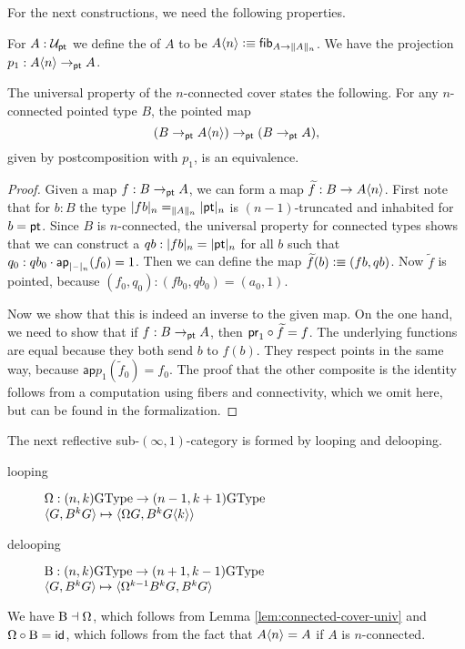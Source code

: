 For the next constructions, we need the following properties.
\begin{defn}
  For $A : \UU_\pt$ we define the  of $A$ to be 
  $A{\angled n} \defeq  \fibf{A \to \trunc{n}{A}}$. We have the projection $p_1: A{\angled n} \to_\pt A$.
\end{defn}

\begin{lem} \label{lem:connected-cover-univ}
  The universal property of the $n$-connected cover states the following. For any $n$-connected pointed type $B$, the pointed map
  $$(B \to_\pt A{\angled n}) \to_\pt (B \to_\pt A),$$
  given by postcomposition with $p_1$, is an equivalence.\\
\end{lem}

\begin{proof}
  Given a map $f:B\to_\pt A$, we can form a map $\widetilde f: B \to A{\angled n}$. First note that for $b:B$ the type $\truncunit{fb}_n=_{\trunc{n}{A}}\truncunit{\pt}_n$ is $(n-1)$-truncated and inhabited for $b=\pt$. Since $B$ is $n$-connected, the universal property for connected types shows that we can construct a $qb:\truncunit{fb}_n=\truncunit{\pt}_n$ for all $b$ such that $q_0:qb_0\cdot\mathsf{ap}_{\truncunit{\blank}_n}(f_0)=1$. Then we can define the map $\widetilde f(b)\defeq (fb, qb)$. Now $\widetilde f$ is pointed, because $(f_0,q_0):(fb_0,qb_0)=(a_0,1)$.

  Now we show that this is indeed an inverse to the given map. On the one hand, we need to show that if $f: B \to_\pt A$, then $\proj 1 \circ \widetilde f=f$. The underlying functions are equal because they both send $b$ to $f(b)$. They respect points in the same way, because
  $\mathsf{ap}{p_1}(\widetilde f_0)=f_0$. The proof that the other composite is the identity follows from a computation using fibers and connectivity, which we omit here, but can be found in the formalization.
\end{proof}

The next reflective sub-$(\infty,1)$-category is formed by looping and delooping.
\begin{description}
\item[looping] $\loopspacesym : (n,k)\GType \to (n-1,k+1)\GType$ \\
  $\angled{G,B^kG} \mapsto \angled{\loopspacesym G,B^kG{\angled k}}$
\item[delooping] $\B : (n,k)\GType \to (n+1,k-1)\GType$ \\
  $\angled{G,B^kG} \mapsto \angled{\loopspacesym^{k-1}B^kG,B^kG}$
\end{description}
We have ${\B} \dashv {\loopspacesym}$, which follows from Lemma \ref{lem:connected-cover-univ} %
and $\loopspacesym\circ{\B} = \idfunc$, which follows from the fact that $A{\angled n}=A$ if $A$ is $n$-connected.

